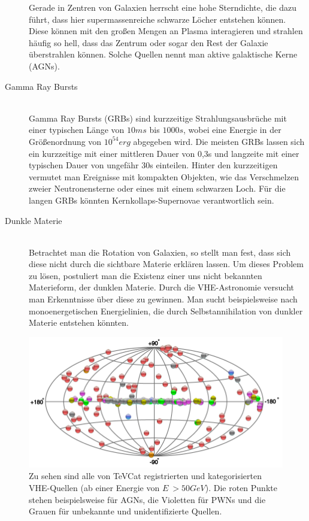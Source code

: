 \begin{description}
Gerade in Zentren von Galaxien herrscht eine hohe Sterndichte, die dazu führt, dass hier supermassenreiche schwarze Löcher entstehen können. Diese können mit den großen Mengen an Plasma interagieren und strahlen häufig so hell, dass das Zentrum oder sogar den Rest der Galaxie überstrahlen können. Solche Quellen nennt man aktive galaktische Kerne (AGNs).
\item[Gamma Ray Bursts]\hfill \\
Gamma Ray Bursts (GRBs) sind kurzzeitige Strahlungsausbrüche mit einer typischen Länge von $10\unit{ms}$ bis $1000\unit{s}$, wobei eine Energie in der Größenordnung von $10^{54}\unit{erg}$ abgegeben wird. %
Die meisten GRBs lassen sich ein kurzzeitige mit einer mittleren Dauer von 0,3s und langzeite mit einer typischen Dauer von ungefähr 30s einteilen. Hinter den kurzzeitigen vermutet man Ereignisse mit kompakten Objekten, wie das Verschmelzen zweier Neutronensterne oder eines mit einem schwarzen Loch. Für die langen GRBs könnten Kernkollaps-Supernovae verantwortlich sein.
\item[Dunkle Materie]\hfill \\
Betrachtet man die Rotation von Galaxien, so stellt man fest, dass sich diese nicht durch die sichtbare Materie erklären lassen. Um dieses Problem zu lösen, postuliert man die Existenz einer uns nicht bekannten Materieform, der dunklen Materie. Durch die VHE-Astronomie versucht man Erkenntnisse über diese zu gewinnen. Man sucht beispielsweise nach monoenergetischen Energielinien, die durch Selbstannihilation von dunkler Materie entstehen könnten.
\end{description}

\begin{figure}[htbp]
\centering
\includegraphics[width=\textwidth]{Images/tevcat.png}
\caption{Zu sehen sind alle von TeVCat registrierten und kategorisierten VHE-Quellen (ab einer Energie von $E~>50\unit{GeV}$\cite{TeVCat2}). Die roten Punkte stehen beispielsweise für AGNs, die Violetten für PWNs und die Grauen für unbekannte und unidentifizierte Quellen. \cite{TevCat}}
\label{img:tevcat}
\end{figure}



